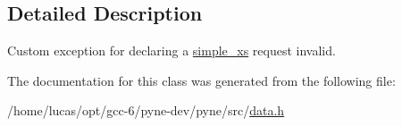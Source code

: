\subsection{Detailed Description}
Custom exception for declaring a \hyperlink{structsimple__xs}{simple\+\_\+xs} request invalid. 

The documentation for this class was generated from the following file\+:\begin{DoxyCompactItemize}
\item 
/home/lucas/opt/gcc-\/6/pyne-\/dev/pyne/src/\hyperlink{data_8h}{data.\+h}\end{DoxyCompactItemize}
